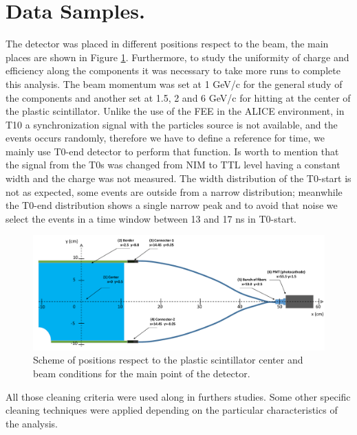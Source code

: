\section{Data Samples.}
	
	The detector was placed in different positions respect to the beam, the main places are shown in  Figure \ref{figure:zones}.
	Furthermore, to study the uniformity of charge and efficiency along the components it was necessary to take more runs to complete this analysis. %
	The beam momentum was set at 1 GeV/c for the general study of the components
	and another set at 1.5, 2 and 6 GeV/c for hitting at the center of the plastic scintillator.
	Unlike the use of the FEE in the ALICE environment, in T10 a synchronization signal with the particles source 
	is not available, and the 	events occurs randomly, therefore we have to define a reference for time, we 
	mainly use T0-end detector to perform that function. %
	Is worth to mention that the signal from the T0s was changed from NIM to TTL level having a constant width and 
	the charge was not measured. %
	The	width distribution of the T0-start %
	is not as expected, some events are outside from a narrow distribution; meanwhile the T0-end distribution
	shows a single narrow peak and to avoid that noise we select the events in a time window between 13 and 17 ns 
	in T0-start. %
	
	\begin{figure}[ht!]
		\begin{center}
			\includegraphics[scale=0.40]{./images/AD-2D.pdf}
			\caption{Scheme of positions respect to the plastic scintillator center and 
				beam conditions for the main point of the detector.%
			}
			\label{figure:zones}
		\end{center}
	\end{figure}

All those cleaning criteria were used along in furthers studies. Some other specific cleaning techniques
were applied depending on the particular characteristics of the analysis.
